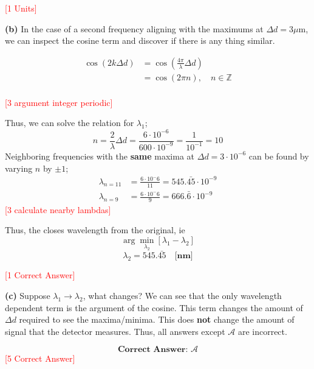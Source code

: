 \begin{solution}
	\textcolor{red}{[1 Units]}
	
	\fullpageboxline

	\textbf{(b)}
	In the case of a second frequency aligning with the maximums at $\Delta d = 3\mu$m, we can inspect the cosine term and discover if there is any thing similar.
	
	\begin{align*}
		\cos(2k\Delta d) &= \cos \left(\frac{4\pi}{\lambda} \Delta d\right)\\
						 &= \cos \left(2 \pi n\right), \quad n \in \mathbb{Z}\\
	\end{align*}

	\textcolor{red}{[3 argument integer periodic]}

	Thus, we can solve the relation for $\lambda_1$;
	\begin{equation}
		n = \frac{2}{\lambda} \Delta d = \frac{6 \cdot  10^{-6}}{600 \cdot 10^{-9}} = \frac{1}{10^{-1}} = 10
	\end{equation}
	Neighboring frequencies with the \textbf{same} maxima at $\Delta d = 3 \cdot 10^{-6}$ can be found by varying $n$ by $\pm 1$;
	\begin{align}
		\lambda_{n=11} &= \frac{6 \cdot 10^-6}{11} = 545.\bar{45} \cdot 10^{-9} \\
		\lambda_{n=9} &= \frac{6 \cdot 10^-6}{9} = 666.\bar{6} \cdot 10^{-9} 
	\end{align}
	\textcolor{red}{[3 calculate nearby lambdas]}

	Thus, the closes wavelength from the original, ie $$\arg \min_{\lambda_2}[\lambda_1 - \lambda_2]$$
	\begin{equation}
		\boxed{
		\lambda_2 = 545.\bar{45} \quad \textbf{[nm]}}
	\end{equation}
	
	\textcolor{red}{[1 Correct Answer]}

	\fullpageboxline

	\textbf{(c)}
	Suppose $\lambda_1 \rightarrow \lambda_2$, what changes? We can see that the only wavelength dependent term is the argument of the cosine. This term changes the amount of $\Delta d$ required to see the maxima/minima. This does \textbf{not} change the amount of signal that the detector measures. Thus, all answers except $\mathcal{A}$ are incorrect.
	
	\begin{equation}
		\boxed{
		\textbf{Correct Answer: }\mathcal{A}}
	\end{equation}
	\textcolor{red}{[5 Correct Answer]}
	
\end{solution} 